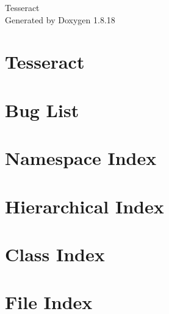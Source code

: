 \let\mypdfximage\pdfximage\def\pdfximage{\immediate\mypdfximage}\documentclass[twoside]{book}
\newcommand{\+}{\discretionary{\mbox{\scriptsize$\hookleftarrow$}}{}{}}
\newcommand{\clearemptydoublepage}{%
  \newpage{\pagestyle{empty}\cleardoublepage}%
}
\begin{document}
\hypersetup{pageanchor=false,
             bookmarksnumbered=true,
             pdfencoding=unicode
            }
\begin{titlepage}
\vspace*{7cm}
\begin{center}%
{\Large Tesseract }\\
\vspace*{1cm}
{\large Generated by Doxygen 1.8.18}\\
\end{center}
\end{titlepage}
\clearemptydoublepage
{}
\tableofcontents
\clearemptydoublepage
{}
\hypersetup{pageanchor=true}

\chapter{Tesseract}
\label{index}\hypertarget{index}{}
\chapter{Bug List}
\label{bug}

\chapter{Namespace Index}

\chapter{Hierarchical Index}

\chapter{Class Index}

\chapter{File Index}

\end{document}
